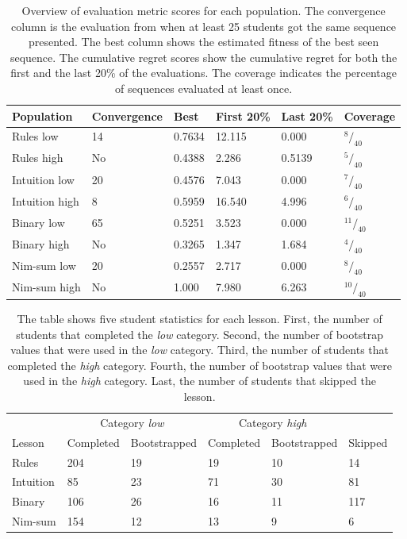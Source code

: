 \begin{table}
	\centering
	\caption[Evaluation metric scores of each population]{Overview of
	evaluation metric scores for each population. The convergence column is the
evaluation from when at least 25 students got the same sequence presented. The
best column shows the estimated fitness of the best seen sequence. The
cumulative regret scores show the cumulative regret for both the first and the
last 20\% of the evaluations. The coverage indicates the percentage of
sequences evaluated at least once.}
	\label{tab:pop_metrics}
	\begin{tabular}{llllll}\hline
		\textbf{Population} & \textbf{Convergence} & \textbf{Best} &
		\textbf{First 20\%} & \textbf{Last 20\%} & \textbf{Coverage} \\\hline
		Rules low & 14 & 0.7634  & 12.115 & 0.000 & $^{8}/_{40}$ \\
		Rules high & No & 0.4388 & 2.286 & 0.5139 & $^{5}/_{40}$ \\
		Intuition low & 20 & 0.4576 & 7.043 & 0.000 & $^{7}/_{40}$ \\
		Intuition high & 8 & 0.5959 & 16.540 & 4.996 & $^{6}/_{40}$ \\
		Binary low & 65 & 0.5251 & 3.523 & 0.000 & $^{11}/_{40}$ \\
		Binary high & No & 0.3265 & 1.347 & 1.684 & $^{4}/_{40}$ \\
		Nim-sum low & 20 & 0.2557 & 2.717 & 0.000 & $^{8}/_{40}$ \\
		Nim-sum high & No & 1.000 & 7.980 & 6.263 & $^{10}/_{40}$ \\
	\end{tabular}
\end{table}

\begin{table}
	\centering
	\caption[Student statistics of each lesson]{The table shows five student statistics for each lesson.
	First, the number of students that completed the \emph{low} category.
	Second, the number of bootstrap values that were used in the
	\emph{low} category. Third, the number of students that completed the
	\emph{high} category. Fourth, the number of bootstrap values that were used in
	the \emph{high} category. Last, the number of students that skipped the
	lesson.}
	\label{tab:exp_stats_students}
	\begin{tabular}{l|lllll}\hline
		\multicolumn{1}{l}{}& \multicolumn{2}{c}{Category \emph{low}} & \multicolumn{2}{c}{Category
			\emph{high}} & \\
		\multicolumn{1}{l}{Lesson} & Completed & Bootstrapped & Completed & Bootstrapped & Skipped\\
		\hline
		Rules & 204 & 19 & 19 & 10 & 14 \\
		Intuition & 85 &  23 & 71 & 30 & 81 \\
		Binary & 106 & 26 & 16 & 11 & 117 \\
		Nim-sum & 154 & 12 & 13 & 9 & 6 \\
	\end{tabular}
\end{table}

